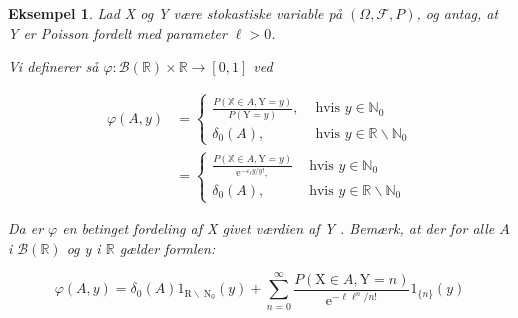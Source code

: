 \documentclass{article}
\newcommand{\1}{\mathbbm{1}}
\theoremstyle{boxed}
\newtheorem{example}[theorem]{Eksempel}
\begin{document}
\begin{example}
    Lad X og Y være stokastiske variable på $(\Omega, \mathcal{F}, P)$, og antag, at Y er Poisson fordelt med parameter $\ell>0$.

Vi definerer så $\varphi: \mathcal{B}(\mathbb{R}) \times \mathbb{R} \rightarrow[0,1]$ ved

$$
\begin{aligned}
\varphi(A, y) & = \begin{cases}\frac{P(\mathbb{X} \in A, \mathrm{Y}=y)}{P(\mathrm{Y}=y)}, & \text { hvis } y \in \mathbb{N}_0 \\
\delta_0(A), & \text { hvis } y \in \mathbb{R} \backslash \mathbb{N}_0\end{cases} \\
& = \begin{cases}\frac{P(\mathbb{X} \in A, \mathrm{Y}=y)}{\mathrm{e}^{-\varepsilon_{\ell} y / y!},} & \text { hvis } y \in \mathbb{N}_0 \\
\delta_0(A), & \text { hvis } y \in \mathbb{R} \backslash \mathbb{N}_0\end{cases}
\end{aligned}
$$


Da er $\varphi$ en betinget fordeling af X givet værdien af Y .
Bemærk, at der for alle $A$ i $\mathcal{B}(\mathbb{R})$ og y i $\mathbb{R}$ gælder formlen:

$$
\varphi(A, y)=\delta_0(A) 1_{\mathrm{R} \backslash \mathrm{~N}_0}(y)+\sum_{n=0}^{\infty} \frac{P(\mathrm{X} \in A, \mathrm{Y}=n)}{\mathrm{e}^{-\ell \ell^n / n!}} 1_{\{n\}}(y)
$$

\end{example}
\end{document}
